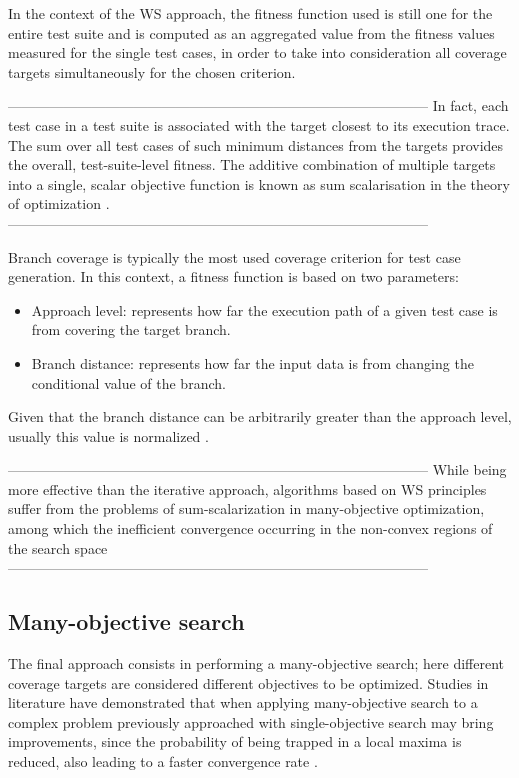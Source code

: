 In the context of the WS approach, the fitness function used is still one for the entire test suite and is computed as an aggregated value from the fitness values measured for the single test cases, in order to take into consideration all coverage targets simultaneously for the chosen criterion.

------------------------------------------------------------------------------------------
In fact, each test case in a test suite
is associated with the target closest to its execution trace.
The sum over all test cases of such minimum distances
from the targets provides the overall, test-suite-level fitness.
The additive combination of multiple targets into a single,
scalar objective function is known as sum scalarisation in
the theory of optimization \cite{SearchMethodologies}.
------------------------------------------------------------------------------------------

Branch coverage is typically the most used coverage criterion for test case generation. In this context, a fitness function
is based on two parameters: 
\begin{itemize}
    \item Approach level: represents how far the execution path of a given test case is from covering the target branch.
    \item Branch distance: represents how far the input data is from changing the conditional value of the branch.
\end{itemize}
Given that the branch distance can be arbitrarily greater than the approach level, usually this value is normalized \cite{DBLP:conf/icst/Arcuri10}.

------------------------------------------------------------------------------------------
While being more effective than the iterative approach, algorithms based on WS principles suffer from the problems of sum-scalarization in many-objective optimization, among which the inefficient convergence occurring in the non-convex regions of the search space
------------------------------------------------------------------------------------------

\subsection{Many-objective search}
The final approach consists in performing a many-objective search; here different coverage targets are considered different objectives to be optimized. 
Studies in literature \cite{DBLP:conf/ppsn/HandlLK08} have demonstrated that when applying many-objective search to a complex problem previously approached with single-objective search may bring improvements, since the probability of being trapped in a local maxima is reduced, also leading to a faster convergence rate \cite{DBLP:conf/icst/PanichellaKT15}.

